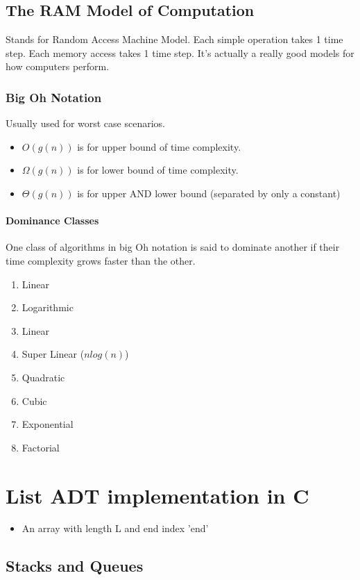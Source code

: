 \documentclass[a4paper,12pt]{report}
\begin{document}
\section{The RAM Model of Computation}
Stands for Random Access Machine Model.
Each simple operation takes 1 time step. Each memory access takes 1 time step. It's actually a really good models for how computers perform.

\subsection{Big Oh Notation}
Usually used for worst case scenarios.
\begin{itemize}
\item $O(g(n))$ is for upper bound of time complexity.
\item $\Omega(g(n))$ is for lower bound of time complexity.
\item $\Theta(g(n))$ is for upper AND lower bound (separated by only a constant)
\end{itemize}

\subsubsection{Dominance Classes}
One class of algorithms in big Oh notation is said to dominate another if their time complexity grows faster than the other.
\begin{enumerate}
\item Linear
\item Logarithmic
\item Linear
\item Super Linear ($n log(n)$)
\item Quadratic
\item Cubic
\item Exponential
\item Factorial
\end{enumerate}
	

\chapter{List ADT implementation in C}
\begin{itemize}
\item An array with length L and end index 'end'
\end{itemize}

\section{Stacks and Queues}
\end{document}
